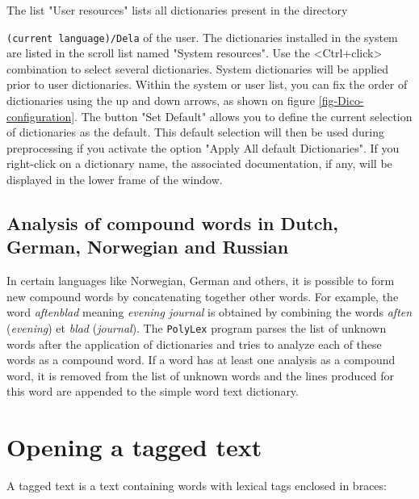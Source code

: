 \bigskip
\noindent The list "User resources" lists all dictionaries present in the
directory

\noindent \verb+(current language)/Dela+ of the user. The dictionaries installed
in the system are listed in the scroll list  named "System resources". Use the
<Ctrl+click> combination to select several dictionaries. System dictionaries
will be applied prior to user dictionaries. Within the system or user list, you
can fix the order of dictionaries using the up and down arrows, as shown on
figure \ref{fig-Dico-configuration}. The button "Set
Default" allows you to define the current selection of dictionaries  as the
default. This default selection will then be used during preprocessing if you
activate the option "Apply All default Dictionaries". If you right-click on a dictionary name, the associated documentation,
if any, will be displayed in the lower frame of the window.


\subsection{Analysis of compound words in Dutch, German, Norwegian and Russian}
\label{section-Norwegian-compound-words}
In certain languages like Norwegian, German and others, it is possible to form
new compound words by concatenating  together other words. For example, the word
\textit{aftenblad} meaning \textit{evening journal} is obtained by combining the
words \textit{aften} (\textit{evening}) et \textit{blad} (\textit{journal}). The
\verb+PolyLex+ program  parses the list of unknown words after the application
of dictionaries and tries to analyze each of these words as a compound word. If
a word has at least one analysis as a compound word,  it is removed from the
list of unknown words and the lines produced for this word are appended to the
simple word text dictionary.



\section{Opening a tagged text}
A tagged text is a text containing words with lexical tags enclosed in braces:

